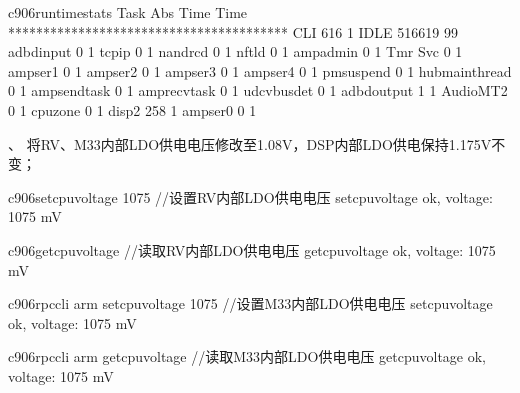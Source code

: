 \documentclass[letterpaper,10pt,english]{sphinxmanual}
\begin{document}
\begin{sphinxVerbatim}[commandchars=\\\{\}]
c906\PYGZgt{}run\PYGZhy{}time\PYGZhy{}stats
Task            Abs Time      \PYGZpc{} Time
****************************************
CLI             616             \PYGZlt{}1\PYGZpc{}
IDLE            516619          99\PYGZpc{}
adbd\PYGZhy{}input      0               \PYGZlt{}1\PYGZpc{}
tcpip           0               \PYGZlt{}1\PYGZpc{}
nand\PYGZus{}rcd        0               \PYGZlt{}1\PYGZpc{}
nftld           0               \PYGZlt{}1\PYGZpc{}
amp\PYGZhy{}admin       0               \PYGZlt{}1\PYGZpc{}
Tmr Svc         0               \PYGZlt{}1\PYGZpc{}
amp\PYGZhy{}ser1        0               \PYGZlt{}1\PYGZpc{}
amp\PYGZhy{}ser2        0               \PYGZlt{}1\PYGZpc{}
amp\PYGZhy{}ser3        0               \PYGZlt{}1\PYGZpc{}
amp\PYGZhy{}ser4        0               \PYGZlt{}1\PYGZpc{}
pm\PYGZus{}suspend      0               \PYGZlt{}1\PYGZpc{}
hub\PYGZhy{}main\PYGZhy{}thread 0               \PYGZlt{}1\PYGZpc{}
amp\PYGZhy{}send\PYGZhy{}task   0               \PYGZlt{}1\PYGZpc{}
amp\PYGZhy{}recv\PYGZhy{}task   0               \PYGZlt{}1\PYGZpc{}
udc\PYGZus{}vbus\PYGZus{}det    0               \PYGZlt{}1\PYGZpc{}
adbd\PYGZhy{}output     1               \PYGZlt{}1\PYGZpc{}
AudioMT2        0               \PYGZlt{}1\PYGZpc{}
cpu\PYGZus{}zone        0               \PYGZlt{}1\PYGZpc{}
disp2           258             \PYGZlt{}1\PYGZpc{}
amp\PYGZhy{}ser0        0               \PYGZlt{}1\PYGZpc{}
\end{sphinxVerbatim}

、 将RV、M33内部LDO供电电压修改至1.08V，DSP内部LDO供电保持1.175V不变；

\sphinxAtStartPar
{}

\begin{sphinxVerbatim}[commandchars=\\\{\}]
c906\PYGZgt{}set\PYGZus{}cpu\PYGZus{}voltage 1075 //设置RV内部LDO供电电压
set\PYGZus{}cpu\PYGZus{}voltage ok, voltage: 1075 mV

c906\PYGZgt{}get\PYGZus{}cpu\PYGZus{}voltage  //读取RV内部LDO供电电压
get\PYGZus{}cpu\PYGZus{}voltage ok, voltage: 1075 mV 
\end{sphinxVerbatim}

\sphinxAtStartPar
{}

\begin{sphinxVerbatim}[commandchars=\\\{\}]
c906\PYGZgt{}rpccli arm set\PYGZus{}cpu\PYGZus{}voltage 1075 //设置M33内部LDO供电电压
set\PYGZus{}cpu\PYGZus{}voltage ok, voltage: 1075 mV

c906\PYGZgt{}rpccli arm get\PYGZus{}cpu\PYGZus{}voltage //读取M33内部LDO供电电压
get\PYGZus{}cpu\PYGZus{}voltage ok, voltage: 1075 mV
\end{sphinxVerbatim}
\end{document}
